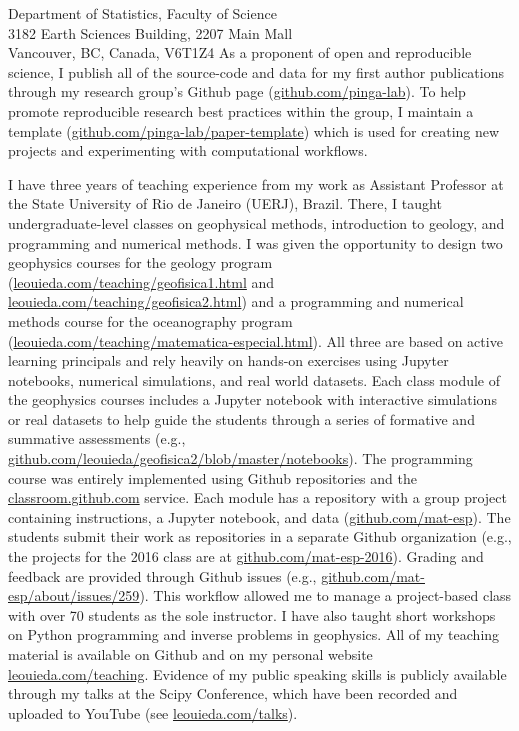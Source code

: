 \documentclass[11pt]{letter}
\begin{document}
\begin{letter}{
    Department of Statistics, Faculty of Science
    \\
    3182 Earth Sciences Building, 2207 Main Mall
    \\
    Vancouver, BC, Canada, V6T1Z4
}
As a proponent of open and reproducible science, I publish all of the
source-code and data for my first author publications through my research
group's Github page
(\href{https://github.com/pinga-lab}{github.com/pinga-lab}).
To help promote reproducible research best practices within the group,
I maintain a template
(\href{https://github.com/pinga-lab/paper-template}{github.com/pinga-lab/paper-template})
which is used for creating new projects and experimenting with computational
workflows.


I have three years of teaching experience from my work as Assistant Professor
at the State University of Rio de Janeiro (UERJ), Brazil.
There, I taught undergraduate-level classes on geophysical methods,
introduction to geology, and programming and numerical methods.
I was given the opportunity to design two geophysics courses for the geology
program
(\href{http://www.leouieda.com/teaching/geofisica1.html}{leouieda.com/teaching/geofisica1.html}
and
\href{http://www.leouieda.com/teaching/geofisica2.html}{leouieda.com/teaching/geofisica2.html})
and a programming and numerical methods course for the oceanography
program
(\href{http://www.leouieda.com/teaching/matematica-especial.html}{leouieda.com/teaching/matematica-especial.html}).
All three are based on active learning principals and rely heavily on hands-on
exercises using Jupyter notebooks, numerical simulations, and real world
datasets.
Each class module of the geophysics courses includes a Jupyter notebook with
interactive simulations or real datasets to help guide the students through a
series of formative and summative assessments
(e.g.,
\href{https://github.com/leouieda/geofisica2/blob/master/notebooks/}{github.com/leouieda/geofisica2/blob/master/notebooks}).
The programming course was entirely implemented using Github repositories and
the \href{https://classroom.github.com/}{classroom.github.com} service.
Each module has a repository with a group project containing instructions, a
Jupyter notebook, and data
(\href{https://github.com/mat-esp}{github.com/mat-esp}).
The students submit their work as repositories in a separate Github
organization
(e.g., the projects for the
2016 class are at
\href{https://github.com/mat-esp-2016}{github.com/mat-esp-2016}).
Grading and feedback are provided through Github issues (e.g.,
\href{https://github.com/mat-esp/about/issues/259}{github.com/mat-esp/about/issues/259}).
This workflow allowed me to manage a project-based class with over 70 students
as the sole instructor.
I have also taught short workshops on Python programming and inverse problems
in geophysics.
All of my teaching material is available on Github and on my personal website
\href{http://www.leouieda.com/teaching/}{leouieda.com/teaching}.
Evidence of my public speaking skills is publicly available through my talks at
the Scipy Conference, which have been recorded and uploaded to YouTube (see
\href{http://www.leouieda.com/talks/}{leouieda.com/talks}).



\end{letter}
\end{document}

